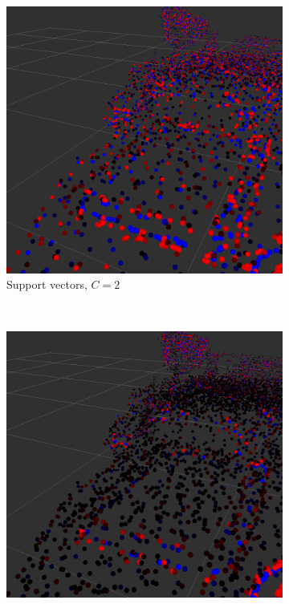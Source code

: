 \begin{figure}
\begin{subfigure}[b]{0.3\textwidth}
                \includegraphics[width=\textwidth]{two_books_2.png}
                \caption{Support vectors, $C=2$}
                \label{fig:2books2}
        \end{subfigure}
        ~ %
        \begin{subfigure}[b]{0.3\textwidth}
                \includegraphics[width=\textwidth]{two_books_16.png}

\end{subfigure}
\end{figure}

